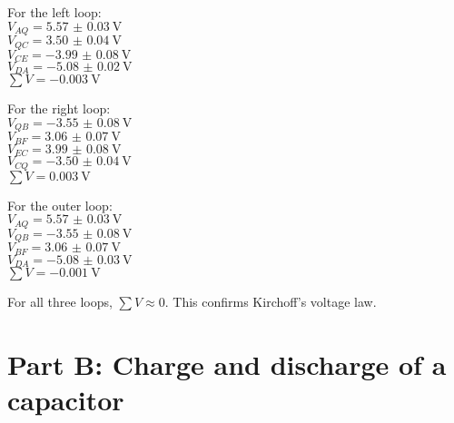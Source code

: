 \documentclass[11pt]{article}
\begin{document}
        \begin{center}
            \begin{minipage}[t]{0.3\textwidth}
                For the left loop: \\
                $V_{AQ}=\SI{+5.57(3)}{\volt}$ \\
                $V_{QC}=\SI{+3.50(4)}{\volt}$ \\
                $V_{CE}=\SI{-3.99(8)}{\volt}$ \\
                $V_{DA}=\SI{-5.08(2)}{\volt}$ \\
                $\sum V=\SI{-0.003}{\volt}$
            \end{minipage}
            \begin{minipage}[t]{0.3\textwidth}
                For the right loop: \\
                $V_{QB}=\SI{-3.55(8)}{\volt}$ \\
                $V_{BF}=\SI{+3.06(7)}{\volt}$ \\
                $V_{EC}=\SI{+3.99(8)}{\volt}$ \\
                $V_{CQ}=\SI{-3.50(4)}{\volt}$ \\
                $\sum V=\SI{0.003}{\volt}$
            \end{minipage}
            \begin{minipage}[t]{0.3\textwidth}
                For the outer loop: \\
                $V_{AQ}=\SI{+5.57(3)}{\volt}$ \\
                $V_{QB}=\SI{-3.55(8)}{\volt}$ \\
                $V_{BF}=\SI{+3.06(7)}{\volt}$ \\
                $V_{DA}=\SI{-5.08(3)}{\volt}$ \\
                $\sum V=\SI{-0.001}{\volt}$
            \end{minipage}
        \end{center}
        For all three loops, $\sum V\approx0$. This confirms Kirchoff's voltage law.
    \pagebreak
    \section*{Part B: Charge and discharge of a capacitor}
\end{document}
